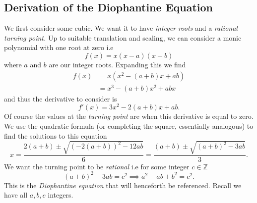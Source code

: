 \documentclass[12pt]{article}
\newcommand{\Z}{\mathbb{Z}}
\begin{document}
\subsection{Derivation of the Diophantine Equation}
We first consider some cubic. We want it to have \textit{integer roots} and a \textit{rational turning point.} Up to suitable translation and scaling, we can consider a monic polynomial with one root at zero i.e
\begin{equation*}
    f(x) = x(x-a)(x-b)
\end{equation*}
where $a$ and $b$ are our integer roots. Expanding this we find
\begin{align*}
    f(x) &= x(x^2 - (a + b)x + ab)\\
    &= x^3 - (a+b)x^2 + abx
\end{align*}
and thus the derivative to consider is
\begin{equation*}
    f'(x) = 3x^2 - 2(a+b)x + ab.
\end{equation*}
Of course the values at the \textit{turning point} are when this derivative is equal to zero. We use the quadratic formula (or completing the square, essentially analogous) to find the solutions to this equation
\begin{equation*}
    x = \frac{2(a+b) \pm \sqrt{(-2(a+b))^2-12ab}}{6} = \frac{(a+b) \pm \sqrt{(a+b)^2 - 3ab}}{3}.
\end{equation*}
We want the turning point to be \textit{rational} i.e for some integer $c \in \Z$
\begin{equation}\label{eq:diophantine_eq1}
    (a+b)^2 - 3ab = c^2 \implies a^2 - ab + b^2 = c^2.
\end{equation}
This is the \textit{Diophantine equation} that will henceforth be referenced. Recall we have all $a, b, c$ integers.
\end{document}
